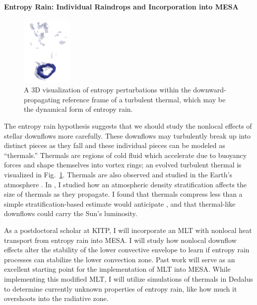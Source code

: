 \documentclass[preprint, hmargin=1in, vmargin=1in]{aastex62}
\begin{document}
\paragraph{Entropy Rain: Individual Raindrops and Incorporation into MESA} 
\begin{figure}
	\begin{center}
	\vspace{-28pt}
    \includegraphics[width=0.22\textwidth]{./figs/turbulent_thermal.png}
	\vspace{-16pt}
	\end{center}
    \caption{
	A 3D visualization of entropy perturbations within the downward-propagating reference frame of a turbulent thermal, which may be the dynamical form of entropy rain.
	\label{fig:thermal} }
	\vspace{-16pt}
\end{figure}

The entropy rain hypothesis suggests that we should study the nonlocal effects of stellar downflows more carefully.
These downflows may turbulently break up into distinct pieces as they fall and these individual pieces can be modeled as ``thermals.''
Thermals are regions of cold fluid which accelerate due to buoyancy forces and shape themselves into vortex rings; an evolved turbulent thermal is visualized in Fig.~\ref{fig:thermal}.
Thermals are also observed and studied in the Earth's atmosphere \citep{lecoanet&jeevanjee2019}.
In \citet{andersLB2019}, I studied how an atmospheric density stratification affects the size of thermals as they propagate.
I found that thermals compress less than a simple stratification-based estimate would anticipate \citep{brandenburg2016}, and that thermal-like downflows could carry the Sun's luminosity. %

As a postdoctoral scholar at KITP, I will incorporate an MLT with nonlocal heat transport from entropy rain into MESA.
I will study how nonlocal downflow effects alter the stability of the lower convective envelope to learn if entropy rain processes can stabilize the lower convection zone.
Past work \citep{brandenburg2016, andersLB2019} will serve as an excellent starting point for the implementation of MLT into MESA.
While implementing this modified MLT, I will utilize simulations of thermals in Dedalus to determine currently unknown properties of entropy rain, like how much it overshoots into the radiative zone.
\end{document}
